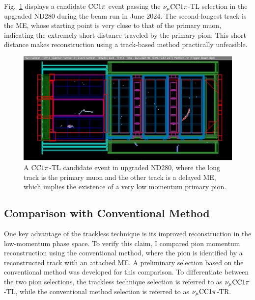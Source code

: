           Fig.~\ref{fig:cc1pi-tl} displays a candidate $\textrm{CC}1\pi$ event passing the $\nu_{\mu}\textrm{CC}1\pi$-TL selection in the upgraded ND280 during the beam run in June 2024. 
          The second-longest track is the ME, whose starting point is very close to that of the primary muon, indicating the extremely short distance traveled by the primary pion. 
          This short distance makes reconstruction using a track-based method practically unfeasible.
          \begin{figure}[!ht] 	
               \centering 		
               \includegraphics[width=\sgfigwid\textwidth]{figures/shortPion.png}
               \caption{\label{fig:cc1pi-tl} A $\textrm{CC}1\pi$-TL candidate event in upgraded ND280, where the long track is the primary muon and the other track is a delayed ME, which implies the existence of a very low momentum primary pion.} 
          \end{figure}

     \subsection{Comparison with Conventional Method}
     \label{sec:comparison-conventional}

          One key advantage of the trackless technique is its improved reconstruction in the low-momentum phase space. 
          To verify this claim, I compared pion momentum reconstruction using the conventional method, where the pion is identified by a reconstructed track with an attached ME. 
          A preliminary selection based on the conventional method was developed for this comparison. 
          To differentiate between the two pion selections, the trackless technique selection is referred to as $\nu_{\mu}\textrm{CC}1\pi$-TL, while the conventional method selection is referred to as $\nu_{\mu}\textrm{CC}1\pi$-TR.

